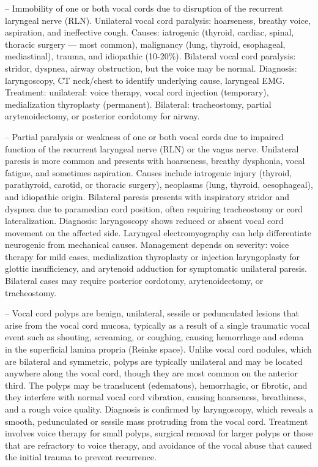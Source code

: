 -- Immobility of one or both vocal cords due to disruption of the recurrent laryngeal nerve (RLN). Unilateral vocal cord paralysis: hoarseness, breathy voice, aspiration, and ineffective cough. Causes: iatrogenic (thyroid, cardiac, spinal, thoracic surgery — most common), malignancy (lung, thyroid, esophageal, mediastinal), trauma, and idiopathic (10-20\%). Bilateral vocal cord paralysis: stridor, dyspnea, airway obstruction, but the voice may be normal. Diagnosis: laryngoscopy, CT neck/chest to identify underlying cause, laryngeal EMG. Treatment: unilateral: voice therapy, vocal cord injection (temporary), medialization thyroplasty (permanent). Bilateral: tracheostomy, partial arytenoidectomy, or posterior cordotomy for airway.

-- Partial paralysis or weakness of one or both vocal cords due to impaired function of the recurrent laryngeal nerve (RLN) or the vagus nerve. Unilateral paresis is more common and presents with hoarseness, breathy dysphonia, vocal fatigue, and sometimes aspiration. Causes include iatrogenic injury (thyroid, parathyroid, carotid, or thoracic surgery), neoplasms (lung, thyroid, oesophageal), and idiopathic origin. Bilateral paresis presents with inspiratory stridor and dyspnea due to paramedian cord position, often requiring tracheostomy or cord lateralization. Diagnosis: laryngoscopy shows reduced or absent vocal cord movement on the affected side. Laryngeal electromyography can help differentiate neurogenic from mechanical causes. Management depends on severity: voice therapy for mild cases, medialization thyroplasty or injection laryngoplasty for glottic insufficiency, and arytenoid adduction for symptomatic unilateral paresis. Bilateral cases may require posterior cordotomy, arytenoidectomy, or tracheostomy.

-- Vocal cord polyps are benign, unilateral, sessile or pedunculated lesions that arise from the vocal cord mucosa, typically as a result of a single traumatic vocal event such as shouting, screaming, or coughing, causing hemorrhage and edema in the superficial lamina propria (Reinke space). Unlike vocal cord nodules, which are bilateral and symmetric, polyps are typically unilateral and may be located anywhere along the vocal cord, though they are most common on the anterior third. The polyps may be translucent (edematous), hemorrhagic, or fibrotic, and they interfere with normal vocal cord vibration, causing hoarseness, breathiness, and a rough voice quality. Diagnosis is confirmed by laryngoscopy, which reveals a smooth, pedunculated or sessile mass protruding from the vocal cord. Treatment involves voice therapy for small polyps, surgical removal for larger polyps or those that are refractory to voice therapy, and avoidance of the vocal abuse that caused the initial trauma to prevent recurrence.

